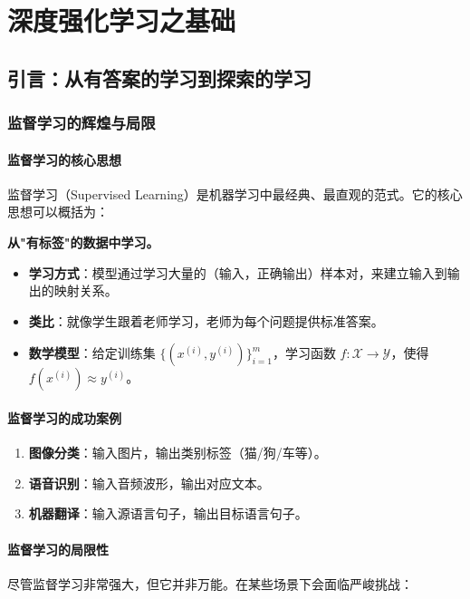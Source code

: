 \chapter{深度强化学习之基础}
\section{引言：从有答案的学习到探索的学习}

\subsection{监督学习的辉煌与局限}

\subsubsection{监督学习的核心思想}
监督学习（Supervised Learning）是机器学习中最经典、最直观的范式。它的核心思想可以概括为：

\textbf{从"有标签"的数据中学习。}

\begin{itemize}
    \item \textbf{学习方式}：模型通过学习大量的（输入，正确输出）样本对，来建立输入到输出的映射关系。
    \item \textbf{类比}：就像学生跟着老师学习，老师为每个问题提供标准答案。
    \item \textbf{数学模型}：给定训练集 $\{(x^{(i)}, y^{(i)})\}_{i=1}^m$，学习函数 $f: \mathcal{X} \rightarrow \mathcal{Y}$，使得 $f(x^{(i)}) \approx y^{(i)}$。
\end{itemize}

\subsubsection{监督学习的成功案例}
\begin{enumerate}
    \item \textbf{图像分类}：输入图片，输出类别标签（猫/狗/车等）。
    \item \textbf{语音识别}：输入音频波形，输出对应文本。
    \item \textbf{机器翻译}：输入源语言句子，输出目标语言句子。
\end{enumerate}

\subsubsection{监督学习的局限性}
尽管监督学习非常强大，但它并非万能。在某些场景下会面临严峻挑战：

